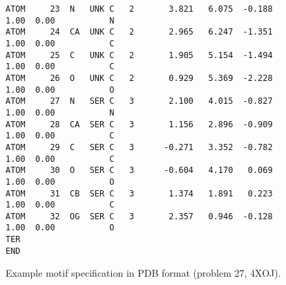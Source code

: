 \begin{figure}
\begin{tcolorbox}
\begin{verbatim}
ATOM     23  N   UNK C   2       3.821   6.075  -0.188  1.00  0.00           N  
ATOM     24  CA  UNK C   2       2.965   6.247  -1.351  1.00  0.00           C  
ATOM     25  C   UNK C   2       1.905   5.154  -1.494  1.00  0.00           C  
ATOM     26  O   UNK C   2       0.929   5.369  -2.228  1.00  0.00           O  
ATOM     27  N   SER C   3       2.100   4.015  -0.827  1.00  0.00           N  
ATOM     28  CA  SER C   3       1.156   2.896  -0.909  1.00  0.00           C  
ATOM     29  C   SER C   3      -0.271   3.352  -0.782  1.00  0.00           C  
ATOM     30  O   SER C   3      -0.604   4.170   0.069  1.00  0.00           O  
ATOM     31  CB  SER C   3       1.374   1.891   0.223  1.00  0.00           C  
ATOM     32  OG  SER C   3       2.357   0.946  -0.128  1.00  0.00           O  
TER
END   
\end{verbatim}
\end{tcolorbox}
    \caption{Example motif specification in PDB format (problem 27, 4XOJ).  }
    \label{fig:example_motif}
\end{figure}
